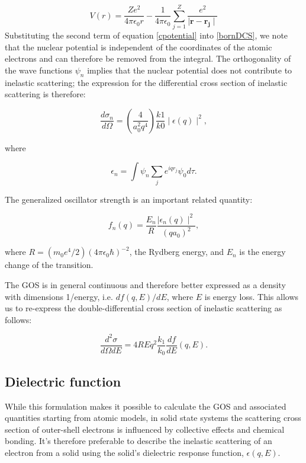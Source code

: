 \documentclass [11pt, proquest, article] {uwthesis}[2016/11/22]
\begin{document}
\begin{equation} \label{cpotential}
V(r) = \frac{Ze^2}{4\pi \epsilon_0 r} - \frac{1}{4 \pi \epsilon_0} \sum_{j = 1}^Z \frac{e^2}{\mid \mathbf{r} - \mathbf{r_j} \mid}
\end{equation}
Substituting the second term of equation \ref{cpotential} into \ref{bornDCS}, we note that the nuclear potential is independent of the coordinates of the atomic electrons and can therefore be removed from the integral. The orthogonality of the wave functions $\psi_n$ implies that the nuclear potential does not contribute to inelastic scattering; the expression for the differential cross section of inelastic scattering is therefore:

\begin{equation} \label{inelasticDCS}
\frac{d\sigma_n}{d\Omega} = (\frac{4}{a_0^2 q^4}) \frac{k1}{k0} \mid \epsilon(q)\mid^2,
\end{equation}

where

\begin{equation}
	\epsilon_n = \int \psi_n \sum_j e^{i q r_j} \psi_0 d\tau.
\end{equation}


The generalized oscillator strength is an important related quantity:

\begin{equation}
f_n(q) = \frac{E_n}{R} \frac{\mid \epsilon_n(q)\mid ^2}{(q a_0)^2},
\end{equation}


where $R = (m_0 e^4 / 2)(4 \pi \epsilon_0 \hbar)^{-2}$, the Rydberg energy, and $E_n$ is the energy change of the transition. 

The GOS is in general continuous and therefore better expressed as a density with dimensions 1/energy, i.e. $df(q, E)/dE$, where $E$ is energy loss. This allows us to re-express the double-differential cross section of inelastic scattering as follows:

\begin{equation} \label{inelastic_DDCS}
\frac{d^2\sigma}{d\Omega dE} = {4 R}{Eq^2} \frac{k_1}{k_0} \frac{df}{dE}(q, E).
\end{equation}


\subsection{Dielectric function}
While this formulation makes it possible to calculate the GOS and associated quantities starting from atomic models, in solid state systems the scattering cross section of outer-shell electrons is influenced by collective effects and chemical bonding. It's therefore preferable to describe the inelastic scattering of an electron from a solid using the solid's dielectric response function, $\epsilon(q, E)$. 
\end{document}
